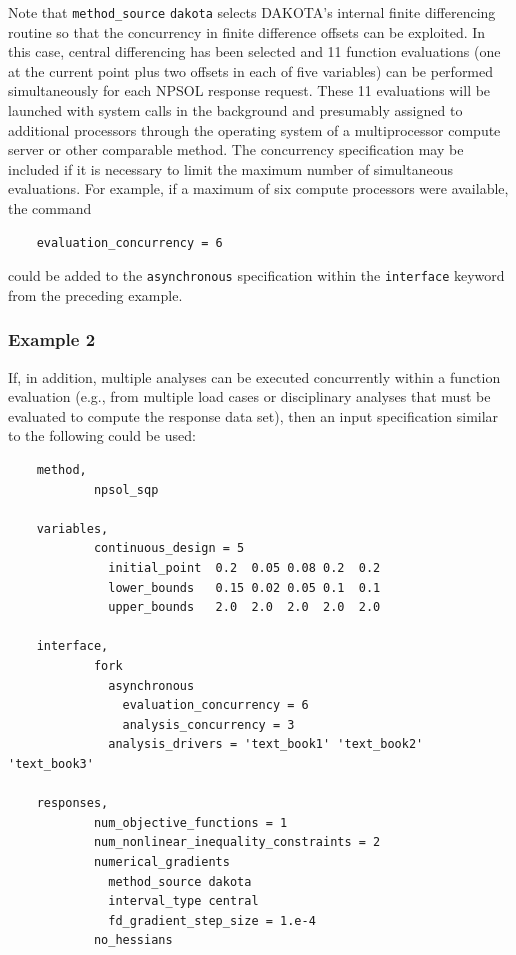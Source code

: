 Note that \texttt{method\_source} \texttt{dakota} selects DAKOTA's
internal finite differencing routine so that the concurrency in finite
difference offsets can be exploited. In this case, central
differencing has been selected and 11 function evaluations (one at the
current point plus two offsets in each of five variables) can be
performed simultaneously for each NPSOL response request. These 11
evaluations will be launched with system calls in the background and
presumably assigned to additional processors through the operating
system of a multiprocessor compute server or other comparable method.
The concurrency specification may be included if it is necessary to
limit the maximum number of simultaneous evaluations. For example, if
a maximum of six compute processors were available, the command
\begin{small}
\begin{verbatim}
    evaluation_concurrency = 6
\end{verbatim}
\end{small}
could be added to the \texttt{asynchronous} specification within the
\texttt{interface} keyword from the preceding example.

\subsubsection{Example 2}\label{parallel:spec:single:example2}

If, in addition, multiple analyses can be executed concurrently within
a function evaluation (e.g., from multiple load cases or disciplinary
analyses that must be evaluated to compute the response data set),
then an input specification similar to the following could be used:
\begin{small}
\begin{verbatim}
    method,
            npsol_sqp

    variables,
            continuous_design = 5
              initial_point  0.2  0.05 0.08 0.2  0.2
              lower_bounds   0.15 0.02 0.05 0.1  0.1
              upper_bounds   2.0  2.0  2.0  2.0  2.0

    interface,
            fork
              asynchronous
                evaluation_concurrency = 6
                analysis_concurrency = 3
              analysis_drivers = 'text_book1' 'text_book2' 'text_book3'

    responses,
            num_objective_functions = 1
            num_nonlinear_inequality_constraints = 2
            numerical_gradients
              method_source dakota
              interval_type central
              fd_gradient_step_size = 1.e-4
            no_hessians
\end{verbatim}
\end{small}

